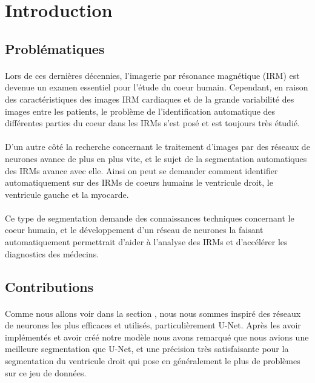 \documentclass[french, english]{article}
\begin{document}
\section{Introduction}  

\subsection{Problématiques}
\paragraph{}Lors de ces dernières décennies, l'imagerie par résonance magnétique (IRM) est devenue un examen essentiel pour l'étude du coeur humain. Cependant, en raison des caractéristiques des images IRM cardiaques et de la grande variabilité des images entre les patients, le problème de l'identification automatique des différentes parties du coeur dans les IRMs s'est posé et est toujours très étudié.
\paragraph{} D'un autre côté la recherche concernant le traitement d'images par des réseaux de neurones avance de plus en plus vite, et le sujet de la segmentation automatiques des IRMs avance avec elle. Ainsi on peut se demander comment identifier automatiquement sur des IRMs de coeurs humains le ventricule droit, le ventricule gauche et la myocarde. 
\paragraph{} Ce type de segmentation demande des connaissances techniques concernant le coeur humain, et le développement d'un réseau de neurones la faisant automatiquement permettrait d'aider à l'analyse des IRMs et d'accélérer les diagnostics des médecins. 


\subsection{Contributions}
\paragraph{} Comme nous allons voir dans la section , nous nous sommes inspiré des réseaux de neurones les plus efficaces et utilisés, particulièrement U-Net. Après les avoir implémentés et avoir créé notre modèle nous avons remarqué que nous avions une meilleure segmentation que U-Net, et une précision très satisfaisante pour la segmentation du ventricule droit qui pose en généralement le plus de problèmes sur ce jeu de données.
\end{document}
